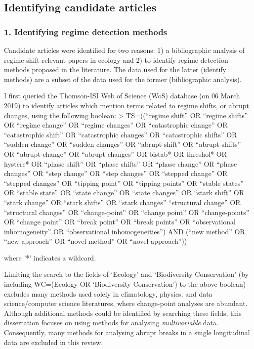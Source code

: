 \documentclass[12pt,twoside,openany]{reedthesis}
\begin{document}
\hypertarget{identifying-candidate-articles}{%
\subsection{Identifying candidate articles}\label{identifying-candidate-articles}}

\hypertarget{identifying-regime-detection-methods}{%
\subsubsection{1. Identifying regime detection methods}\label{identifying-regime-detection-methods}}

Candidate articles were identified for two reasons: 1) a bibliographic analysis of regime shift relevant papers in ecology and 2) to identify regime detection methods proposed in the literature. The data used for the latter (identify methods) are a subset of the data used for the former (bibliographic analysis).

I first queried the Thomson-ISI Web of Science (WoS) database (on 06 March 2019) to identify articles which mention terms related to regime shifts, or abrupt changes, using the following boolean:
\textgreater{} TS=((``regime shift'' OR ``regime shifts'' OR ``regime change'' OR ``regime changes'' OR ``catastrophic change'' OR ``catastrophic shift'' OR ``catastrophic changes'' OR ``catastrophic shifts'' OR ``sudden change'' OR ``sudden changes'' OR ``abrupt shift'' OR ``abrupt shifts'' OR ``abrupt change'' OR ``abrupt changes'' OR bistab* OR threshol* OR hystere* OR ``phase shift'' OR ``phase shifts'' OR ``phase change'' OR ``phase changes'' OR ``step change'' OR ``step changes'' OR ``stepped change'' OR ``stepped changes'' OR ``tipping point'' OR ``tipping points'' OR ``stable states'' OR ``stable state'' OR ``state change'' OR ``state changes'' OR ``stark shift'' OR ``stark change'' OR ``stark shifts'' OR ``stark changes'' ``structural change'' OR ``structural changes'' OR ``change-point'' OR ``change point'' OR ``change-points'' OR ``change point'' OR ``break point'' OR ``break points'' OR ``observational inhomogeneity'' OR ``observational inhomogeneities'') AND (``new method'' OR ``new approach'' OR ``novel method'' OR ``novel approach''))

where '*' indicates a wildcard.

Limiting the search to the fields of `Ecology' and `Biodiversity Conservation' (by including WC=(Ecology OR `Biodiversity Conservation') to the above boolean) excludes many methods used solely in climatology, physics, and data science/computer science literatures, where change-point analyses are abundant. Although additional methods could be identified by searching these fields, this dissertation focuses on using methods for analysing \emph{multivariable} data. Consequently, many methods for analysing abrupt breaks in a single longitudinal data are excluded in this review.
\end{document}
